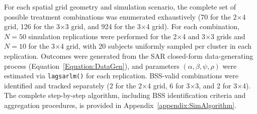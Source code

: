 \documentclass{article}[11pt]
\begin{document}
For each spatial grid geometry and simulation scenario, the complete set of possible treatment combinations was enumerated exhaustively (70 for the 2$\times$4 grid, 126 for the 3$\times$3 grid, and 924 for the 3$\times$4 grid). For each combination, $N = 50$ simulation replications were performed for the 2$\times$4 and 3$\times$3 grids and $N = 10$ for the 3$\times$4 grid, with 20 subjects uniformly sampled per cluster in each replication. Outcomes were generated from the SAR closed-form data-generating process (Equation~\ref{Equation:DataGen}), and parameters $(\alpha, \beta, \psi, \rho)$ were estimated via \texttt{lagsarlm()} for each replication. BSS-valid combinations were identified and tracked separately (2 for the 2$\times$4 grid, 6 for 3$\times$3, and 2 for 3$\times$4). The complete step-by-step algorithm, including BSS identification criteria and aggregation procedures, is provided in Appendix~\ref{appendix:SimAlgorithm}.




\end{document}
